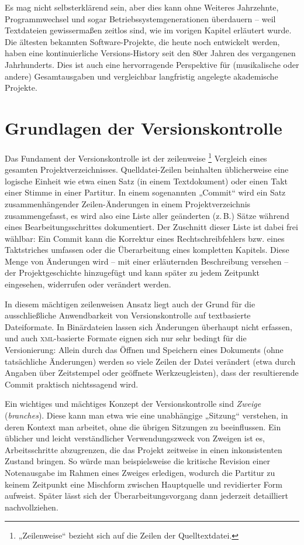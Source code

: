 \documentclass[DIV=12]{scrreprt}
\begin{document}
Es mag nicht selbsterklärend sein, aber dies kann ohne Weiteres Jahrzehnte, Programmwechsel und sogar Betriebssystemgenerationen überdauern -- weil Textdateien gewissermaßen zeitlos sind, wie im vorigen Kapitel erläutert wurde.
Die ältesten bekannten Software-Projekte, die heute noch entwickelt werden, haben eine kontinuierliche Versions-History seit den 80er Jahren des vergangenen Jahrhunderts.
Dies ist auch eine hervorragende Perspektive für (musikalische oder andere) Gesamtausgaben und vergleichbar langfristig angelegte akademische Projekte.

\section{Grundlagen der Versionskontrolle}
\label{sec:pt_basics-version-control}
Das Fundament der Versionskontrolle ist der zeilenweise%
\footnote{„Zeilenweise“ bezieht sich auf die Zeilen der Quelltextdatei.}
Vergleich eines gesamten Projektverzeichnisses.
Quelldatei-Zeilen beinhalten üblicherweise eine logische Einheit wie etwa einen Satz (in einem Textdokument) oder einen Takt einer Stimme in einer Partitur.
In einem sogenannten „Commit“ wird ein Satz zusammenhängender Zeilen-Änderungen in 
einem Projektverzeichnis zusammengefasst, es wird also eine Liste aller geänderten (z.\,B.) Sätze während eines Bearbeitungsschrittes dokumentiert.
Der Zuschnitt dieser Liste ist dabei frei wählbar:
Ein Commit kann die Korrektur eines Rechtschreibfehlers bzw. eines Taktstriches umfassen oder die Überarbeitung eines kompletten Kapitels.
Diese Menge von Änderungen wird -- mit einer erläuternden Beschreibung versehen -- der Projektgeschichte hinzugefügt und kann später zu jedem Zeitpunkt eingesehen, widerrufen oder verändert werden.

In diesem mächtigen zeilenweisen Ansatz liegt auch der Grund für die ausschließliche Anwendbarkeit von Versionskontrolle auf textbasierte Dateiformate.
In Binärdateien lassen sich Änderungen überhaupt nicht erfassen, und auch \textsc{xml}-basierte Formate eignen sich nur sehr bedingt für die Versionierung:
Allein durch das Öffnen und Speichern eines Dokuments (ohne tatsächliche Änderungen) werden so viele Zeilen der Datei verändert (etwa durch Angaben über Zeitstempel oder geöffnete Werkzeugleisten), dass der resultierende Commit praktisch nichtssagend wird.

Ein wichtiges und mächtiges Konzept der Versionskontrolle sind \emph{Zweige} (\emph{branches}).
Diese kann man etwa wie eine unabhängige „Sitzung“ verstehen, in deren Kontext man arbeitet, ohne die übrigen Sitzungen zu beeinflussen.
Ein üblicher und leicht verständlicher Verwendungszweck von Zweigen ist es, 
Arbeitsschritte abzugrenzen, die das Projekt zeitweise in einen inkonsistenten Zustand bringen.
So würde man beispielsweise die kritische Revision einer Notenausgabe im Rahmen eines Zweiges erledigen, wodurch die Partitur zu keinem Zeitpunkt eine Mischform zwischen Hauptquelle und revidierter Form aufweist.
Später lässt sich der Überarbeitungsvorgang dann jederzeit detailliert nachvollziehen.
\end{document}
